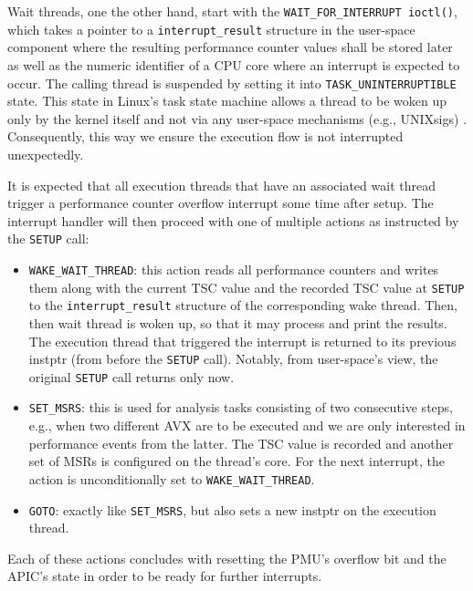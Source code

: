 Wait threads, one the other hand, start with the \texttt{WAIT\_FOR\_INTERRUPT ioctl()}, which takes a pointer to a \texttt{interrupt\_result} structure in the user-space component where the resulting performance counter values shall be stored later as well as the numeric identifier of a \gls{CPU} core where an interrupt is expected to occur. The calling thread is suspended by setting it into \texttt{TASK\_UNINTERRUPTIBLE} state. This state in \gls{Linux}'s task state machine allows a thread to be woken up only by the kernel itself and not via any user-space mechanisms (e.g., \glspl{UNIXsig}) \cite{kernelschedheader}. Consequently, this way we ensure the execution flow is not interrupted unexpectedly.

It is expected that all execution threads that have an associated wait thread trigger a performance counter overflow interrupt some time after setup. The interrupt handler will then proceed with one of multiple actions as instructed by the \texttt{SETUP} call:

\begin{itemize}
	\item \texttt{WAKE\_WAIT\_THREAD}: this action reads all performance counters and writes them along with the current \gls{TSC} value and the recorded \gls{TSC} value at \texttt{SETUP} to the \texttt{interrupt\_result} structure of the corresponding wake thread. Then, then wait thread is woken up, so that it may process and print the results. The execution thread that triggered the interrupt is returned to its previous \acrlong{instptr} (from before the \texttt{SETUP} call). Notably, from user-space's view, the original \texttt{SETUP} call returns only now.
	\item \texttt{SET\_MSRS}: this is used for analysis tasks consisting of two consecutive steps, e.g., when two different \gls{AVX} are to be executed and we are only interested in performance events from the latter. The \gls{TSC} value is recorded and another set of \glspl{MSR} is configured on the thread's core. For the next interrupt, the action is unconditionally set to \texttt{WAKE\_WAIT\_THREAD}.
	\item \texttt{GOTO}: exactly like \texttt{SET\_MSRS}, but also sets a new \acrlong{instptr} on the execution thread.
\end{itemize}

Each of these actions concludes with resetting the \gls{PMU}'s overflow bit and the \gls{APIC}'s state in order to be ready for further interrupts.

